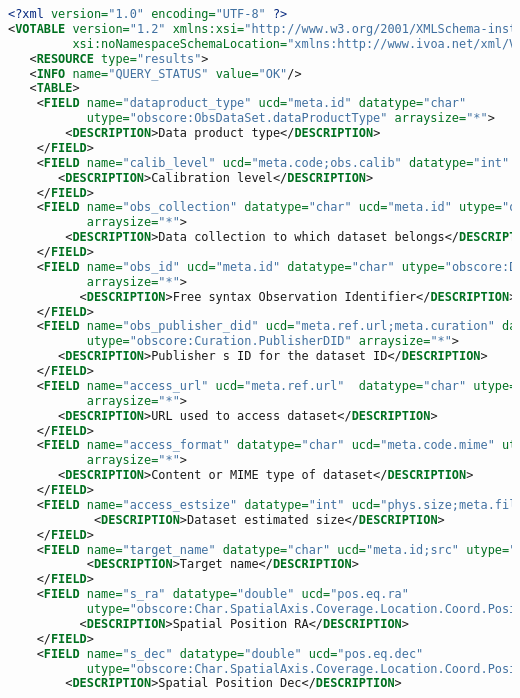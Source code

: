 \documentclass[11pt,a4paper]{ivoa}
\begin{document}
\begin{lstlisting}[basicstyle=\scriptsize,language=XML]
<?xml version="1.0" encoding="UTF-8" ?>
<VOTABLE version="1.2" xmlns:xsi="http://www.w3.org/2001/XMLSchema-instance"
         xsi:noNamespaceSchemaLocation="xmlns:http://www.ivoa.net/xml/VOTable-1.2.xsd" >
   <RESOURCE type="results">
   <INFO name="QUERY_STATUS" value="OK"/>
   <TABLE>
    <FIELD name="dataproduct_type" ucd="meta.id" datatype="char"
           utype="obscore:ObsDataSet.dataProductType" arraysize="*">
        <DESCRIPTION>Data product type</DESCRIPTION>
    </FIELD>
    <FIELD name="calib_level" ucd="meta.code;obs.calib" datatype="int" utype="obscore:ObsDataSet.calibLevel">
       <DESCRIPTION>Calibration level</DESCRIPTION>
    </FIELD>
    <FIELD name="obs_collection" datatype="char" ucd="meta.id" utype="obscore:DataID.Collection"
           arraysize="*">
        <DESCRIPTION>Data collection to which dataset belongs</DESCRIPTION>
    </FIELD>
    <FIELD name="obs_id" ucd="meta.id" datatype="char" utype="obscore:DataID.observationID"
           arraysize="*">
          <DESCRIPTION>Free syntax Observation Identifier</DESCRIPTION>
    </FIELD>
    <FIELD name="obs_publisher_did" ucd="meta.ref.url;meta.curation" datatype="char"
           utype="obscore:Curation.PublisherDID" arraysize="*">
       <DESCRIPTION>Publisher s ID for the dataset ID</DESCRIPTION>
    </FIELD>
    <FIELD name="access_url" ucd="meta.ref.url"  datatype="char" utype="obscore:Access.Reference"
           arraysize="*">
       <DESCRIPTION>URL used to access dataset</DESCRIPTION>
    </FIELD>
    <FIELD name="access_format" datatype="char" ucd="meta.code.mime" utype="obscore:Access.Format"
           arraysize="*">
       <DESCRIPTION>Content or MIME type of dataset</DESCRIPTION>
    </FIELD>
    <FIELD name="access_estsize" datatype="int" ucd="phys.size;meta.file" utype="obscore:Access.Size">
            <DESCRIPTION>Dataset estimated size</DESCRIPTION>
    </FIELD>
    <FIELD name="target_name" datatype="char" ucd="meta.id;src" utype="obscore:Target.Name" arraysize="*">
           <DESCRIPTION>Target name</DESCRIPTION>
    </FIELD>
    <FIELD name="s_ra" datatype="double" ucd="pos.eq.ra"
           utype="obscore:Char.SpatialAxis.Coverage.Location.Coord.Position2D.Value2.C1" unit="deg" >
          <DESCRIPTION>Spatial Position RA</DESCRIPTION>
    </FIELD>
    <FIELD name="s_dec" datatype="double" ucd="pos.eq.dec"
           utype="obscore:Char.SpatialAxis.Coverage.Location.Coord.Position2D.Value2.C2" unit="deg" >
        <DESCRIPTION>Spatial Position Dec</DESCRIPTION>

\end{lstlisting}
\end{document}
